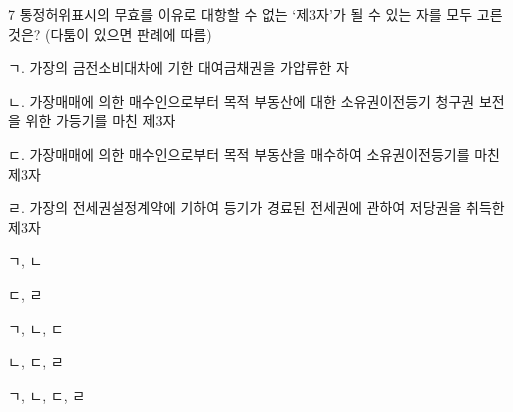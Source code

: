 \begin{question}{7}
통정허위표시의 무효를 이유로 대항할 수 없는 ‘제3자’가 될 수 있는 자를 모두 고른 것은? (다툼이 있으면 판례에 따름)
\begin{framedtext}
ㄱ. 가장의 금전소비대차에 기한 대여금채권을 가압류한 자 \par
ㄴ. 가장매매에 의한 매수인으로부터 목적 부동산에 대한 소유권이전등기 청구권 보전을 위한 가등기를 마친 제3자 \par
ㄷ. 가장매매에 의한 매수인으로부터 목적 부동산을 매수하여 소유권이전등기를 마친 제3자 \par
ㄹ. 가장의 전세권설정계약에 기하여 등기가 경료된 전세권에 관하여 저당권을 취득한 제3자 \par
\end{framedtext}
\begin{choices}
  \item ㄱ, ㄴ
  \item ㄷ, ㄹ
  \item ㄱ, ㄴ, ㄷ
  \item ㄴ, ㄷ, ㄹ
  \item ㄱ, ㄴ, ㄷ, ㄹ
\end{choices}
\end{question}
